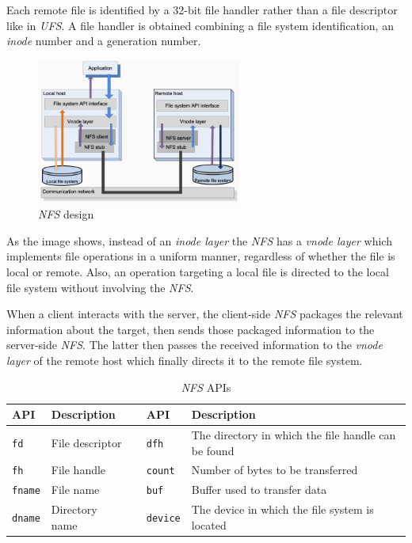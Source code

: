 Each remote file is identified by a 32-bit file handler rather than a file
descriptor like in \emph{UFS}. A file handler is obtained combining a file
system identification, an \emph{inode} number and a generation number.

\begin{figure}[h!]
    \centering
    \includegraphics[width=0.6\textwidth]{images/nfs-design.png}
    \caption{\emph{NFS} design}
\end{figure}

\noindent
As the image shows, instead of an \emph{inode layer} the \emph{NFS} has a
\emph{vnode layer} which implements file operations in a uniform manner,
regardless of whether the file is local or remote. Also, an operation targeting
a local file is directed to the local file system without involving the \emph{NFS}.

When a client interacts with the server, the client-side \emph{NFS} packages the
relevant information about the target, then sends those packaged information to
the server-side \emph{NFS}. The latter then passes the received information to the
\emph{vnode layer} of the remote host which finally directs it to the remote
file system.

\newpage
\begin{table}[ht!]
    \centering
    \begin{tabular}{|l|l|c|l|p{}|}
        \hline
        \textbf{API} & \textbf{Description} && \textbf{API} & \textbf{Description}\\
        \hline
        \texttt{fd} & File descriptor && \texttt{dfh} & The directory in which the file
        handle can be found\\
        \hline
        \texttt{fh} & File handle && \texttt{count} & Number of bytes to be transferred\\
        \hline
        \texttt{fname} & File name && \texttt{buf} & Buffer used to transfer data\\
        \hline
        \texttt{dname} & Directory name && \texttt{device} & The device in which the
        file system is located\\
        \hline
    \end{tabular}
    \caption{\emph{NFS} APIs}
\end{table}


